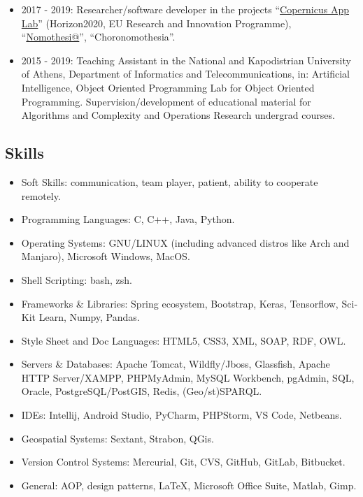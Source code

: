 \documentclass[a4paper,oneside,10pt]{article}
\begin{document}
\begin{itemize}

	\item 2017 - 2019: Researcher/software developer in the projects ``\href{https://cordis.europa.eu/project/id/730124}{Copernicus App Lab}'' (Horizon2020, EU Research and Innovation Programme), ``\href{http://legislation.di.uoa.gr}{Nomothesi@}'', ``Choronomothesia''. 

	\item 2015 - 2019: Teaching Assistant in the National and Kapodistrian University of Athens, Department of Informatics and Telecommunications, in: Artificial Intelligence, Object Oriented Programming Lab for Object Oriented Programming. Supervision/development of educational material for Algorithms and Complexity and Operations Research undergrad courses.

\end{itemize}

\subsection*{Skills}

\begin{itemize}

\item Soft Skills: communication, team player, patient, ability to cooperate remotely.

\item Programming Languages: \textlatin{C, C++, Java, Python}.

\item Operating Systems: \textlatin{GNU/LINUX (including advanced distros like Arch and Manjaro), Microsoft Windows, MacOS}.

\item Shell Scripting: \textlatin{bash, zsh}.

\item Frameworks \& Libraries: \textlatin{Spring ecosystem, Bootstrap, Keras, Tensorflow, SciKit Learn, Numpy, Pandas}.

\item Style Sheet and Doc Languages: \textlatin{HTML5, CSS3, XML, SOAP, RDF, OWL}.

\item Servers \& Databases: \textlatin{Apache Tomcat, Wildfly/Jboss, Glassfish, Apache HTTP Server/XAMPP, PHPMyAdmin, MySQL Workbench, pgAdmin, SQL, Oracle, PostgreSQL/PostGIS, Redis, (Geo/st)SPARQL}.

\item IDEs: \textlatin{Intellij, Android Studio, PyCharm, PHPStorm, VS Code, Netbeans}.

\item Geospatial Systems: \textlatin{Sextant, Strabon, QGis}.

\item Version Control Systems: \textlatin{Mercurial, Git, CVS, GitHub, GitLab, Bitbucket}.

\item General: \textlatin{AOP, design patterns, \LaTeX, Microsoft Office Suite, Matlab, Gimp}.

\end{itemize}
\end{document}
